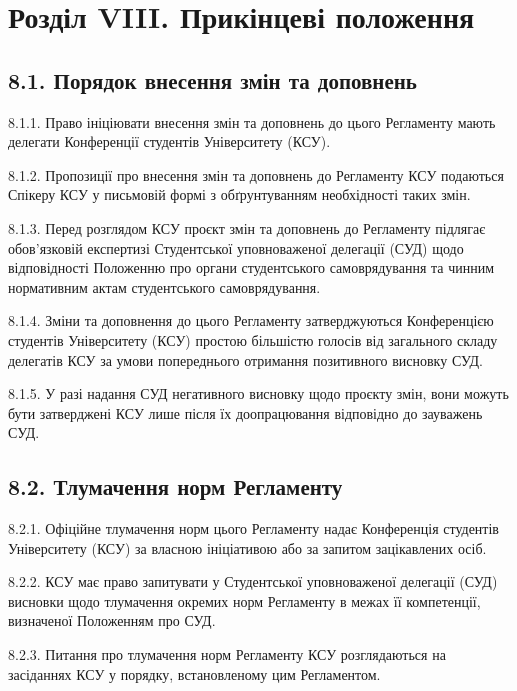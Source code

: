 \section*{Розділ VIII. Прикінцеві положення}

\subsection*{8.1. Порядок внесення змін та доповнень}
    8.1.1. Право ініціювати внесення змін та доповнень до цього Регламенту мають делегати Конференції студентів Університету (КСУ).

    8.1.2. Пропозиції про внесення змін та доповнень до Регламенту КСУ подаються Спікеру КСУ у письмовій формі з обґрунтуванням необхідності таких змін.

    8.1.3. Перед розглядом КСУ проєкт змін та доповнень до Регламенту підлягає обов'язковій експертизі Студентської уповноваженої делегації (СУД) щодо відповідності Положенню про органи студентського самоврядування та чинним нормативним актам студентського самоврядування.

    8.1.4. Зміни та доповнення до цього Регламенту затверджуються Конференцією студентів Університету (КСУ) простою більшістю голосів від загального складу делегатів КСУ за умови попереднього отримання позитивного висновку СУД.

    8.1.5. У разі надання СУД негативного висновку щодо проєкту змін, вони можуть бути затверджені КСУ лише після їх доопрацювання відповідно до зауважень СУД.

\subsection*{8.2. Тлумачення норм Регламенту}
    8.2.1. Офіційне тлумачення норм цього Регламенту надає Конференція студентів Університету (КСУ) за власною ініціативою або за запитом зацікавлених осіб.

    8.2.2. КСУ має право запитувати у Студентської уповноваженої делегації (СУД) висновки щодо тлумачення окремих норм Регламенту в межах її компетенції, визначеної Положенням про СУД.

    8.2.3. Питання про тлумачення норм Регламенту КСУ розглядаються на засіданнях КСУ у порядку, встановленому цим Регламентом.

